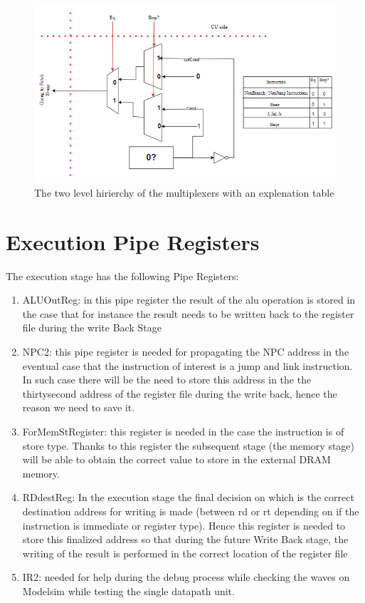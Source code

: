 \begin{figure}[h!]
    \centering
    \includegraphics[scale = 0.8]
    {chapters/figures/BranchAndJumpDecision}
    \caption{The two level hirierchy of the multiplexers with an explenation table}
    \label{fig:BranchAndJumpDecision}
    \end{figure}

\section{ Execution Pipe Registers }

The execution stage has the following Pipe Registers:
\begin{enumerate}
    \item ALUOutReg: in this pipe register the result of the alu operation is stored in the case that for instance the result needs to 
    be written back to the register file during the write Back Stage
    \item NPC2: this pipe register is needed for propagating the NPC address in the eventual case that the instruction of interest is
    a jump and link instruction. In such case there will be the need to store this address in the the thirtysecond address of the register 
    file during the write back, hence the reason we need to save it.
    \item ForMemStRegister: this register is needed in the case the instruction is of store type. Thanks to this register the subsequent stage (the memory stage) will
    be able to obtain the correct value to store in the external DRAM memory.
    \item RDdestReg: In the execution stage the final decision on which is the correct destination address for writing is made (between rd or rt depending on if the instruction is immediate or register type).
    Hence this register is needed to store this finalized address so that during the future Write Back stage, the writing of the result is performed in the correct location of the register file
    \item IR2: needed for help during the debug process while checking the waves on Modelsim while testing the single datapath unit.
\end{enumerate}
